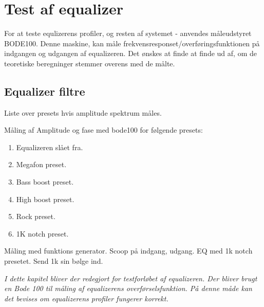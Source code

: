 \chapter{Test af equalizer}\label{sec:test_eq}

For at teste equlizerens profiler, og resten af systemet - anvendes måleudstyret BODE100. Denne maskine, kan måle frekvensresponset/overføringsfunktionen på indgangen og udgangen af equalizeren. Det ønskes at finde at finde ud af, om de teoretiske beregninger stemmer overens med de målte.
\section{Equalizer filtre}


Liste over presets hvis amplitude spektrum måles.

Måling af Amplitude og fase med bode100 for følgende presets:
\begin{enumerate}
    \item Equalizeren slået fra.
    \item Megafon preset.
    \item Bass boost preset.
    \item High boost preset.
    \item Rock preset. 
    \item 1K notch preset.
\end{enumerate}



Måling med funktions generator. Scoop på indgang, udgang.
EQ med 1k notch presetet. 
Send 1k sin bølge ind. 

\emph{I dette kapitel bliver der redegjort for testforløbet af equalizeren. Der bliver brugt en Bode 100 til måling af equalizerens overførselsfunktion. På denne måde kan det bevises om equalizerens profiler fungerer korrekt.}

